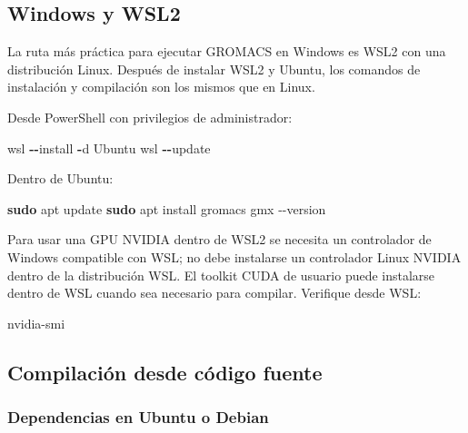 \documentclass[
  spanish,
  11pt,
  a4paper]{article}
\newenvironment{Shaded}{\begin{snugshade}}{\end{snugshade}}
\newcommand{\AttributeTok}[1]{\textcolor[rgb]{0.13,0.29,0.53}{#1}}
\newcommand{\ExtensionTok}[1]{#1}
\newcommand{\FunctionTok}[1]{\textcolor[rgb]{0.13,0.29,0.53}{\textbf{#1}}}
\newcommand{\NormalTok}[1]{#1}
\newcommand{\OperatorTok}[1]{\textcolor[rgb]{0.81,0.36,0.00}{\textbf{#1}}}
\begin{document}
\subsection{Windows y WSL2}\label{windows-y-wsl2}

La ruta más práctica para ejecutar GROMACS en Windows es WSL2 con una
distribución Linux. Después de instalar WSL2 y Ubuntu, los comandos de
instalación y compilación son los mismos que en Linux.

Desde PowerShell con privilegios de administrador:

\begin{Shaded}
\begin{Highlighting}[]
\NormalTok{wsl }\OperatorTok{{-}{-}}\NormalTok{install }\OperatorTok{{-}}\NormalTok{d Ubuntu}
\NormalTok{wsl }\OperatorTok{{-}{-}}\NormalTok{update}
\end{Highlighting}
\end{Shaded}

Dentro de Ubuntu:

\begin{Shaded}
\begin{Highlighting}[]
\FunctionTok{sudo}\NormalTok{ apt update}
\FunctionTok{sudo}\NormalTok{ apt install gromacs}
\ExtensionTok{gmx} \AttributeTok{{-}{-}version}
\end{Highlighting}
\end{Shaded}

Para usar una GPU NVIDIA dentro de WSL2 se necesita un controlador de
Windows compatible con WSL; no debe instalarse un controlador Linux
NVIDIA dentro de la distribución WSL. El toolkit CUDA de usuario puede
instalarse dentro de WSL cuando sea necesario para compilar. Verifique
desde WSL:

\begin{Shaded}
\begin{Highlighting}[]
\ExtensionTok{nvidia{-}smi}
\end{Highlighting}
\end{Shaded}

\subsection{Compilación desde código
fuente}\label{compilaciuxf3n-desde-cuxf3digo-fuente}

\subsubsection{Dependencias en Ubuntu o
Debian}\label{dependencias-en-ubuntu-o-debian}
\end{document}
